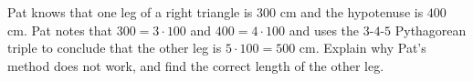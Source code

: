 Pat knows that one leg of a right triangle is $300$ cm and the hypotenuse is $400$ cm. Pat notes that $300=3\cdot100$ and $400=4\cdot100$ and uses the $3$-$4$-$5$ Pythagorean triple to conclude that the other leg is $5\cdot100=500$ cm. Explain why Pat's method does not work, and find the correct length of the other leg.
